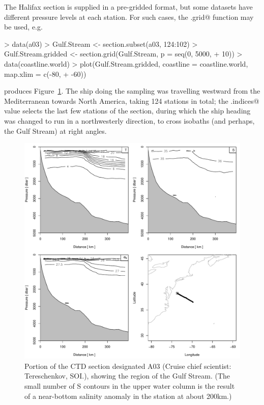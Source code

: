 \documentclass{article}
\begin{document}
The Halifax section is supplied in a pre-gridded format, but some datasets have
different pressure levels at each station.  For such cases, the
\verb@section.grid@ function may be used, e.g.
\begin{Schunk}
\begin{Sinput}
> data(a03)
> Gulf.Stream <- section.subset(a03, 124:102)
> Gulf.Stream.gridded <- section.grid(Gulf.Stream, p = seq(0, 5000, 
+     10))
> data(coastline.world)
> plot(Gulf.Stream.gridded, coastline = coastline.world, map.xlim = c(-80, 
+     -60))
\end{Sinput}
\end{Schunk}
produces Figure~\ref{fig:sectiona03}.  The ship doing the sampling was
travelling westward from the Mediterranean towards North America, taking 124
stations in total; the \verb@station.indices@ value selects the last few
stations of the section, during which the ship heading was changed to run in a
northwesterly direction, to cross isobaths (and perhaps, the Gulf Stream) at
right angles.

\begin{figure}
\begin{center}
\includegraphics{oce-sectionfiga03}
\end{center}
\caption{\label{fig:sectiona03}
Portion of the CTD section designated A03 (Cruise chief scientist: Tereschenkov, SOI.), showing the region of the Gulf Stream.  (The small number of S contours
in the upper water column is the result of a near-bottom salinity anomaly
in the station at about 200km.)
}
\end{figure}
\end{document}
